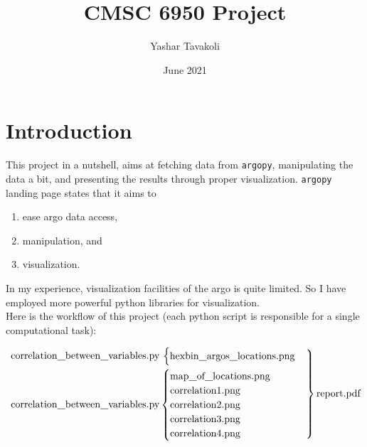 \documentclass[12pt]{article}
\title{CMSC 6950 Project}
\date{June 2021}
\author{Yashar Tavakoli}
\begin{document}
\maketitle
\section{Introduction}

This project in a nutshell, aims at fetching data from \verb|argopy|, manipulating the data a bit, and presenting the results
through proper visualization. \verb|argopy| landing page states that it aims to 
\begin{enumerate}
    \item ease argo data access, 
    \item manipulation, and
    \item visualization. 
\end{enumerate} 
In my experience, visualization facilities of the argo is quite limited. So I have employed more powerful python
libraries for visualization. \\

Here is the workflow of this project (each python script is responsible for a single computational task):

\begin{equation*}
    \begin{rcases}
    \text{correlation\underline{\hspace{8pt}}between\underline{\hspace{8pt}}variables.py}\hspace{2pt}\begin{cases}
      \text{hexbin\underline{\hspace{8pt}}argos\underline{\hspace{8pt}}locations.png}
    \end{cases}
    \\
    \text{correlation\underline{\hspace{8pt}}between\underline{\hspace{8pt}}variables.py}\begin{cases}
        \text{map\underline{\hspace{8pt}}of\underline{\hspace{8pt}}locations.png}\\
        \text{correlation1.png}\\
        \text{correlation2.png}\\
        \text{correlation3.png}\\
        \text{correlation4.png}
    \end{cases}
    \end{rcases}
    \text{report.pdf}
\end{equation*}
\end{document}
